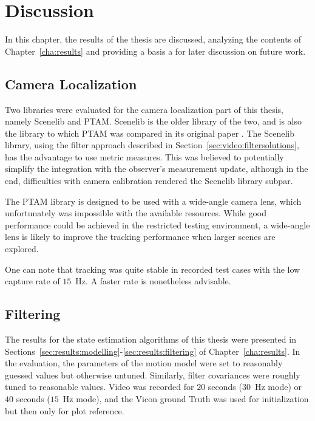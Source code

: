 \chapter{Discussion}
\label{cha:discussion}
    In this chapter, the results of the thesis are discussed,
    analyzing the contents of Chapter~\ref{cha:results} and providing
    a basis a for later discussion on future work.

    \section{Camera Localization}
    \label{sec:discussion:cameralocalization}
        Two libraries were evaluated for the camera localization part of this thesis,
        namely Scenelib and PTAM. Scenelib is the older library of the two,
        and is also the library to which PTAM was compared in its original paper \citep{klein07parallel}.
        The Scenelib library, using the filter approach described in Section~\ref{sec:video:filtersolutions},
        has the advantage to use metric measures.
        This was believed to potentially simplify the integration with the
        observer's measurement update, although in the end, difficulties
        with camera calibration rendered the Scenelib library subpar.

        The PTAM library is designed to be used with a wide-angle camera lens,
        which unfortunately was impossible with the available resources.
        While good performance could be achieved in the restricted testing
        environment, a wide-angle lens is likely to improve the tracking
        performance when larger scenes are explored.

        One can note that tracking was quite stable in recorded test cases
        with the low capture rate of $15$~Hz. A faster rate is nonetheless advisable.

    \section{Filtering}
        The results for the state estimation algorithms of this thesis
        were presented in Sections~\ref{sec:results:modelling}-\ref{sec:results:filtering} of Chapter~\ref{cha:results}.
        In the evaluation, the parameters of the motion model were set to reasonably guessed values
        but otherwise untuned. Similarly, filter covariances were roughly
        tuned to reasonable values. Video was recorded for $20$ seconds ($30$~Hz mode)
        or $40$ seconds ($15$~Hz mode), and the Vicon ground Truth was used for
        initialization but then only for plot reference.

